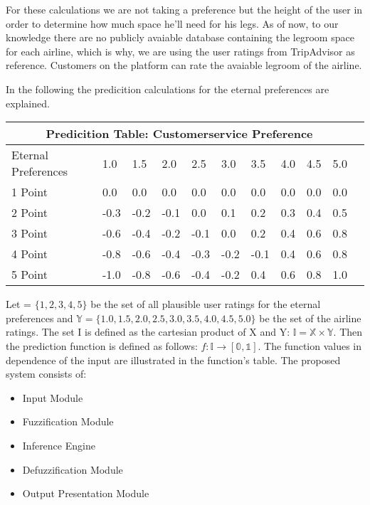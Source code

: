 \documentclass[a4paper]{article}
\begin{document}
\vspace{0.5cm}

For these calculations we are not taking a preference but the height of the user in order to determine how much space he'll need for his legs. As of now, to our knowledge there are no publicly avaiable database containing the legroom space for each airline, which is why, we are using the user ratings from TripAdvisor as reference. Customers on the platform can rate the avaiable legroom of the airline.

In the following the predicition calculations for the eternal preferences are explained.

\vspace{0.5cm}

\begin{tabular}{ |p{3.5cm}||p{0.6cm}|p{0.6cm}|p{0.6cm}|p{0.6cm}|p{0.6cm}|p{0.6cm}|p{0.6cm}|p{0.6cm}|p{0.6cm}|p{0.6cm}|}
 \hline
 \multicolumn{10}{|c|}{Predicition Table: Customerservice Preference} \\
 \hline
 Eternal Preferences & 1.0 & 1.5 & 2.0 & 2.5 & 3.0 & 3.5 & 4.0 & 4.5 & 5.0 \\
 \hline
 1 Point   & 0.0    & 0.0 & 0.0 & 0.0 & 0.0 & 0.0    & 0.0 & 0.0 & 0.0 \\
 2 Point & -0.3  & -0.2   & -0.1 & 0.0 & 0.1 & 0.2 & 0.3 & 0.4 & 0.5  \\
 3 Point & -0.6 & -0.4 &  -0.2 & -0.1 & 0.0 & 0.2 & 0.4 & 0.6 & 0.8\\
 4 Point & -0.8   & -0.6 & -0.4 &  -0.3 & -0.2 & -0.1 & 0.4 & 0.6 &  0.8\\
 5 Point & -1.0  & -0.8 & -0.6 & -0.4 & -0.2 & 0.4 & 0.6 & 0.8 & 1.0\\

 \hline
\end{tabular}

\vspace{0.5cm}

Let  = $\{1, 2, 3, 4, 5\}$ be the set of all plausible user ratings for the eternal preferences and $\mathbb{Y} = \{1.0, 1.5, 2.0, 2.5, 3.0, 3.5, 4.0, 4.5, 5.0 \}$ be the set of the airline ratings. The set I is defined as the cartesian product of X and Y: $\mathbb{I} = \mathbb{X} \times \mathbb{Y}$. Then the prediction function is defined as follows: $f \colon \mathbb{I} \to \mathbb{[0, 1]}.$ The function values in dependence of the input are illustrated in the function's table.
The proposed system consists of:
\begin{itemize}
\item Input Module
\item Fuzzification Module
\item Inference Engine
\item Defuzzification Module
\item Output Presentation Module
\end{itemize}
\end{document}
